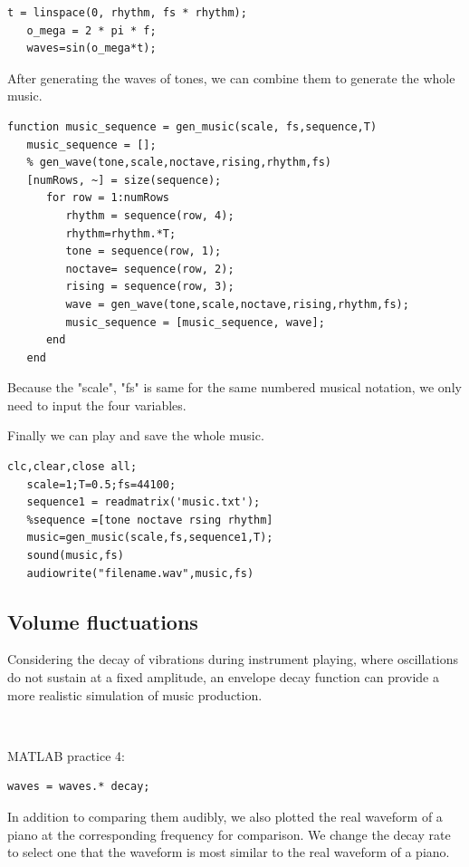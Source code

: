 \documentclass[journal]{IEEEtran}
\begin{document}
\begin{lstlisting}[style=Matlab-editor]
   t = linspace(0, rhythm, fs * rhythm);
   o_mega = 2 * pi * f;
   waves=sin(o_mega*t);
\end{lstlisting}

After generating the waves of tones, we can combine them to generate the whole music.

\begin{lstlisting}[style=Matlab-editor]
   function music_sequence = gen_music(scale, fs,sequence,T)
   music_sequence = [];
   % gen_wave(tone,scale,noctave,rising,rhythm,fs)    
   [numRows, ~] = size(sequence);
      for row = 1:numRows
         rhythm = sequence(row, 4);
         rhythm=rhythm.*T;
         tone = sequence(row, 1);
         noctave= sequence(row, 2); 
         rising = sequence(row, 3);     
         wave = gen_wave(tone,scale,noctave,rising,rhythm,fs);
         music_sequence = [music_sequence, wave];
      end
   end
\end{lstlisting}

Because the "scale", "fs" is same for the same numbered musical notation, we only need to input the four variables.

Finally we can play and save the whole music.
\begin{lstlisting}[style=Matlab-editor]
   clc,clear,close all;
   scale=1;T=0.5;fs=44100;
   sequence1 = readmatrix('music.txt');
   %sequence =[tone noctave rsing rhythm]
   music=gen_music(scale,fs,sequence1,T);
   sound(music,fs)
   audiowrite("filename.wav",music,fs)
\end{lstlisting}
\subsection{Volume fluctuations}
Considering the decay of vibrations during instrument playing, where oscillations do not sustain at a fixed amplitude, an envelope decay function can provide a more realistic simulation of music production.

$~$

\textcolor[rgb]{0,0.6,1}{MATLAB practice 4:}
\begin{lstlisting}[style=Matlab-editor]
   waves = waves.* decay;
\end{lstlisting}

In addition to comparing them audibly, we also plotted the real waveform of a piano at the corresponding frequency for comparison.
We change the decay rate to select one that the waveform is most similar to the real waveform of a piano.
\end{document}
